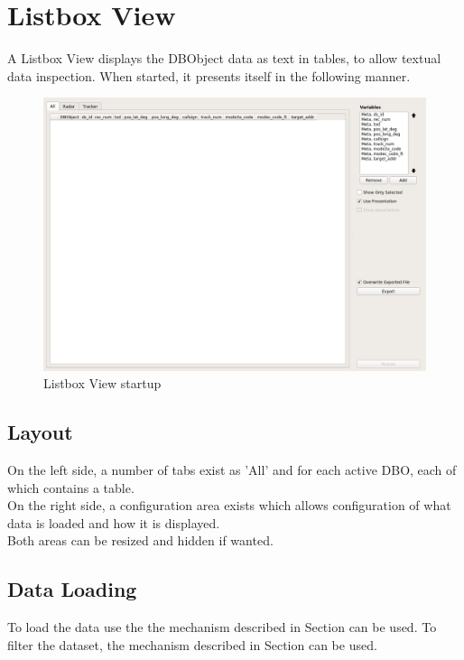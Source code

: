 \chapter{Listbox View}
\label{sec:listbox_view}
A Listbox View displays the DBObject data as text in tables, to allow textual data inspection. When started, it presents itself in the following manner.

\begin{figure}[H]
    \hspace*{-2cm}
    \includegraphics[width=18cm,frame]{../screenshots/listbox_start.png}
  \caption{Listbox View startup}
  \label{fig:listbox_start}
\end{figure}

\section{Layout}


On the left side, a number of tabs exist as 'All' and for each active DBO, each of which contains a table. \\

On the right side, a configuration area exists which allows configuration of what data is loaded and how it is displayed. \\

Both areas can be resized and hidden if wanted.

\section{Data Loading}

To load the data use the the mechanism described in Section  can be used. To filter the dataset, the mechanism described in Section  can be used. \\

